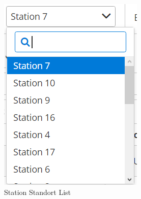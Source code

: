 \documentclass[enabledeprecatedfontcommands,fontsize=12pt,paper=a4,twoside]{scrartcl}
\begin{document}
\begin{figure}[h!]
\begin{center}
 \includegraphics[width=\textwidth]{screenshots/admin/stationstandortliste.png}
  \caption{Station Standort List}
  \label{fig:boat2}
\end{center}
\end{figure}
\end{document}
